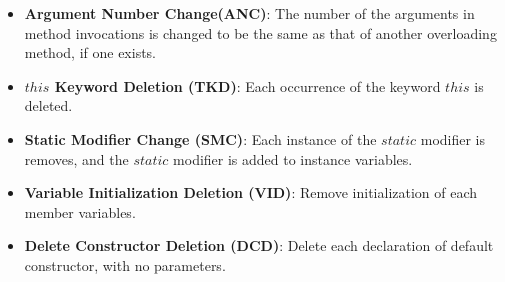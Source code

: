 \documentclass[a4paper]{article}
\begin{document}
\begin{itemize}
    \item \textbf{Argument Number Change(ANC)}: The number of the arguments in method invocations is changed to be the same as that of another overloading method, if one exists.
    \item \textbf{$this$ Keyword Deletion (TKD)}: Each occurrence of the keyword $this$ is deleted.
    \item \textbf{Static Modifier Change (SMC)}: Each instance of the $static$ modifier is removes, and the $static$ modifier is added to instance variables.
    \item \textbf{Variable Initialization Deletion (VID)}: Remove initialization of each member variables.
    \item \textbf{Delete Constructor Deletion (DCD)}: Delete each declaration of default constructor, with no parameters.
\end{itemize}
\end{document}
